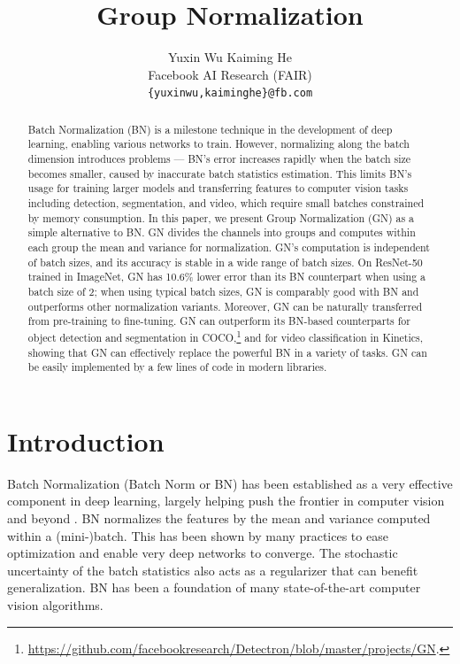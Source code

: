 \documentclass[10pt,twocolumn,letterpaper]{article}
\begin{document}
\title{Group Normalization}
\author{
 Yuxin Wu \qquad\qquad Kaiming He \vspace{3mm}\\
 Facebook AI Research (FAIR)
\\
{\tt\small \{yuxinwu,kaiminghe\}@fb.com}
\vspace{-1.5em}
}

\maketitle

\begin{abstract} \vspace{-.5em}
Batch Normalization (BN) is a milestone technique in the development of deep learning, enabling various networks to train. However, normalizing along the batch dimension introduces problems --- BN's error increases rapidly when the batch size becomes smaller, caused by inaccurate batch statistics estimation. This limits BN's usage for training larger models and transferring features to computer vision tasks including detection, segmentation, and video, which require small batches constrained by memory consumption. In this paper, we present Group Normalization (GN) as a simple alternative to BN. GN divides the channels into groups and computes within each group the mean and variance for normalization. GN's computation is independent of batch sizes, and its accuracy is stable in a wide range of batch sizes. On ResNet-50 trained in ImageNet, GN has 10.6\% lower error than its BN counterpart when using a batch size of 2; when using typical batch sizes, GN is comparably good with BN and outperforms other normalization variants. Moreover, GN can be naturally transferred from pre-training to fine-tuning. GN can outperform its BN-based counterparts for object detection and segmentation in COCO,\footnote{\url{https://github.com/facebookresearch/Detectron/blob/master/projects/GN}.} and for video classification in Kinetics, showing that GN can effectively replace the powerful BN in a variety of tasks. GN can be easily implemented by a few lines of code in modern libraries.
\end{abstract}

\vspace{-1em}
\section{Introduction}

Batch Normalization (Batch Norm or BN) \cite{Ioffe2015} has been established as a very effective component in deep learning, largely helping push the frontier in computer vision \cite{Szegedy2016a,He2016} and beyond \cite{Silver2017}. BN normalizes the features by the mean and variance computed within a (mini-)batch. This has been shown by many practices to ease optimization and enable very deep networks to converge. The stochastic uncertainty of the batch statistics also acts as a regularizer that can benefit generalization. BN has been a foundation of many state-of-the-art computer vision algorithms.
\end{document}
